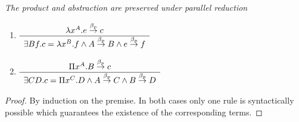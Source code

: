 \begin{lemma}
    \label{ParallelReductionProductAbstraction}
    \emph{The product and abstraction are preserved under parallel
    reduction}

    \begin{enumerate}
    \item
        $\begin{array}{c} \lambda x^A. e \stackrel{\beta_p}{\to} c \\ \hline \exists B f. c = \lambda x^B. f
            \land A \stackrel{\beta_p}{\to} B \land e \stackrel{\beta_p}{\to} f\end{array}$

    \item
        $\begin{array}{c} \Pi x^A. B \stackrel{\beta_p}{\to} c \\ \hline \exists C D. c = \Pi x^C. D
            \land A \stackrel{\beta_p}{\to} C \land B \stackrel{\beta_p}{\to} D\end{array}$
    \end{enumerate}

    \begin{proof} By induction on the premise. In both cases only one rule
    is syntactically possible which guarantees the existence of the
    corresponding terms.
    \end{proof}
\end{lemma}





